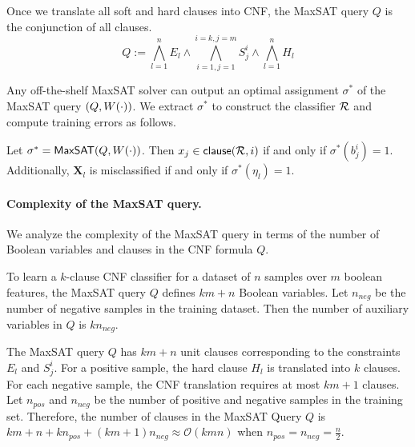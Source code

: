 Once we translate  all soft and hard clauses into CNF, the MaxSAT query $ Q $ is the conjunction of all clauses. 
\[
Q:= \bigwedge_{l=1}^n E_l \wedge  \bigwedge_{i=1,j=1}^{i=k,j=m} S_j^i \wedge \bigwedge_{l=1}^n H_l 
\]
		
Any off-the-shelf MaxSAT solver can output an optimal assignment $ \sigma^* $ of the MaxSAT query $ (Q, W \! \left( \cdot \right)) $. We extract $ \sigma^* $ to construct the classifier $ {\mathcal{R}} $ and compute training errors as follows.
\begin{construction}
	\label{interpretability_imli_construction:rule}
	Let $\sigma^* = \mathsf{MaxSAT}(Q,W \! \left( \cdot \right))$. Then $x_j \in {\ensuremath{\mathsf{clause}}(\ensuremath{{\mathcal{R}}},i)}$ if and only if $\sigma^*(b_{j}^{i}) = 1$. Additionally, $ \mathbf{X}_l $ is misclassified if and only if $ \sigma^*(\eta_l) = 1 $.
\end{construction}




	
	
	 
\paragraph{Complexity of the MaxSAT query.}

We analyze the complexity of the MaxSAT query in terms of the number of Boolean variables and clauses in the CNF formula $ Q $. 

\begin{proposition}
	\label{interpretability_imli_prop:maxsat_variables}
	 To learn a $ k $-clause CNF classifier for a dataset of  $ n $ samples over $ m $ boolean features, the MaxSAT query $ Q $ defines $ km +n $ Boolean variables. Let $ n_{neg} $ be the number of negative samples in the training dataset. Then the number of auxiliary variables in $ Q $ is  $ kn_{neg}  $.
\end{proposition}


\begin{proposition}
	\label{interpretability_imli_prop:maxsat_clauses}
	The MaxSAT query $ Q $ has $ k m+n $ unit clauses corresponding to the constraints $ E_l $ and $ S_j^i $. For a positive sample, the hard clause $ H_l $ is translated into $ k $  clauses. For each negative sample, the CNF translation requires at most $ k m+1 $ clauses. Let $ n_{pos} $ and $ n_{neg} $ be the number of positive and negative samples in the training set. Therefore, the number of clauses in the MaxSAT Query $ Q $ is $ k m+n+k n_{pos}+(k m+1)n_{neg} \approx \mathcal{O}(k m  n ) $ when $ n_{pos}= n_{neg} =\frac{n}{2} $. 
\end{proposition}


